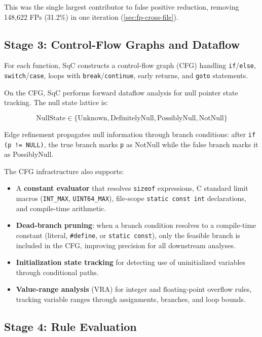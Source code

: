 \documentclass[10pt,twocolumn,letterpaper]{article}
\begin{document}
This was the single largest contributor to false positive reduction,
removing 148,622 FPs (31.2\%) in one iteration (\cref{sec:fp-cross-file}).

\subsection{Stage 3: Control-Flow Graphs and Dataflow}

For each function, SqC constructs a control-flow graph (CFG) handling
\texttt{if}/\texttt{else}, \texttt{switch}/\texttt{case}, loops with
\texttt{break}/\texttt{continue}, early returns, and \texttt{goto}
statements.

On the CFG, SqC performs forward dataflow analysis for null pointer
state tracking.  The null state lattice is:

\begin{equation}
\text{NullState} \in \{\text{Unknown}, \text{DefinitelyNull},
    \text{PossiblyNull}, \text{NotNull}\}
\end{equation}

Edge refinement propagates null information through branch conditions:
after \texttt{if (p != NULL)}, the true branch marks \texttt{p} as
NotNull while the false branch marks it as PossiblyNull.

The CFG infrastructure also supports:
\begin{itemize}
    \item A \textbf{constant evaluator} that resolves \texttt{sizeof}
        expressions, C standard limit macros (\texttt{INT\_MAX},
        \texttt{UINT64\_MAX}), file-scope \texttt{static const int}
        declarations, and compile-time arithmetic.
    \item \textbf{Dead-branch pruning}: when a branch condition
        resolves to a compile-time constant (literal, \texttt{\#define},
        or \texttt{static const}), only the feasible branch is included
        in the CFG, improving precision for all downstream analyses.
    \item \textbf{Initialization state tracking} for detecting
        use of uninitialized variables through conditional paths.
    \item \textbf{Value-range analysis} (VRA) for integer and
        floating-point overflow rules, tracking variable ranges through
        assignments, branches, and loop bounds.
\end{itemize}

\subsection{Stage 4: Rule Evaluation}
\end{document}
